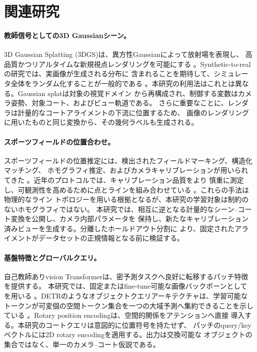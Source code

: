 \section{関連研究}
\label{sec:related_work}

\paragraph{教師信号としての3D Gaussianシーン。}
3D Gaussian Splatting (3DGS)は、異方性Gaussianによって放射場を表現し、
高品質かつリアルタイムな新規視点レンダリングを可能にする
\citep{kerbl2023gaussian}。Synthetic-to-realの研究では、実画像が生成される分布に
含まれることを期待して、シミュレータ全体をランダム化することが一般的である
\citep{tobin2017domain}。本研究の利用法はこれとは異なる。Gaussian splatは対象の視覚ドメイン
から再構成され、制御する変数はカメラ姿勢、対象コート、およびビュー軌道である。
さらに重要なことに、レンダラは計量的なコートアライメントの下流に位置するため、
画像のレンダリングに用いたものと同じ変換から、その幾何ラベルも生成される。

\paragraph{スポーツフィールドの位置合わせ。}
スポーツフィールドの位置推定には、検出されたフィールドマーキング、構造化マッチング、
ホモグラフィ推定、およびカメラキャリブレーションが用いられてきた
\citep{homayounfar2017sports}。近年のプロトコルでは、キャリブレーション品質をより
慎重に測定し、可観測性を高めるために点とラインを組み合わせている
\citep{magera2024procc,gutierrez2026pnlcalib}。これらの手法は物理的なライン
トポロジーを用いる根拠となるが、本研究の学習対象は制約のないホモグラフィではない。
本研究では、相互に逆となる計量的なシーン--コート変換を公開し、カメラ内部パラメータを
保持し、新たなキャリブレーション済みビューを生成する。分離したホールドアウト分割に
より、固定されたアライメントがデータセットの正規情報となる前に検証する。

\paragraph{基盤特徴とグローバルクエリ。}
自己教師ありvision Transformerは、密予測タスクへ良好に転移するパッチ特徴を提供する。
本研究では、固定またはfine-tune可能な画像バックボーンとして\DINO{}を用いる
\citep{simeoni2025dinov3}。DETRのようなオブジェクトクエリアーキテクチャは、学習可能な
トークンが可変個の空間トークン集合を一つの大域予測へ集約できることを示している
\citep{carion2020detr}。Rotary position encodingは、空間的関係をアテンションへ直接
導入する\citep{su2021roformer}。本研究のコートクエリは意図的に位置符号を持たせず、
パッチのquery/keyベクトルには2D rotary encodingを適用する。出力は交換可能な
オブジェクトの集合ではなく、単一のカメラ--コート仮説である。

